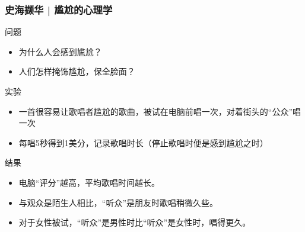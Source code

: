 \begin{frame}
  \frametitle{史海撷华 | 尴尬的心理学}
  \begin{block}{问题}
    \begin{itemize}
      \item 为什么人会感到尴尬？
      \item 人们怎样掩饰尴尬，保全脸面？
    \end{itemize}
  \end{block}
  \vspace{-0.5em}
  \pause
  \begin{block}{实验}
    \begin{itemize}
      \item 一首很容易让歌唱者尴尬的歌曲，被试在电脑前唱一次，对着街头的“公众”唱一次
      \item 每唱5秒得到1美分，记录歌唱时长（停止歌唱时便是感到尴尬之时）
    \end{itemize}
  \end{block}
  \vspace{-0.5em}
  \pause
  \begin{block}{结果}
    \begin{itemize}
      \item 电脑“评分”越高，平均歌唱时间越长。
      \item 与观众是陌生人相比，“听众”是朋友时歌唱稍微久些。
      \item 对于女性被试，“听众”是男性时比“听众”是女性时，唱得更久。
    \end{itemize}
  \end{block}
\end{frame}

